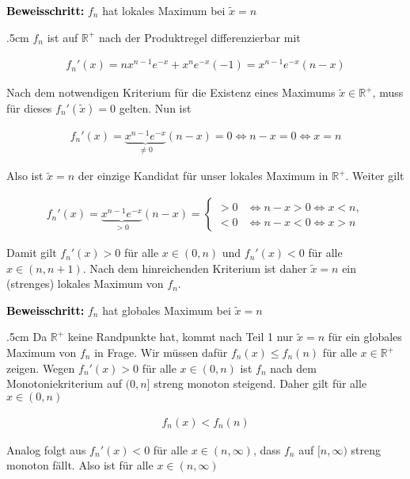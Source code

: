 \documentclass[fontsize=9pt,
               parskip=half-,
               DIV=14,
               listof=chapterentry,
               tocflat]{scrbook}
\newenvironment{indentblock}{\begin{adjustwidth}{.5cm}{}}{\end{adjustwidth}}
\newcommand{\proofstep}[1]{\textbf{\textcolor{Black}{#1}}}
\begin{document}
\begin{solution*}
\proofstep{Beweisschritt:}
 $f_{n}$ hat lokales Maximum bei ${\tilde {x}}=n$\begin{indentblock}
$f_{n}$ ist auf $\mathbb {R} ^{+}$ nach der Produktregel differenzierbar mit

\begin{align*}
f_{n}'(x)=nx^{n-1}e^{-x}+x^{n}e^{-x}(-1)=x^{n-1}e^{-x}(n-x)
\end{align*}

Nach dem notwendigen Kriterium für die Existenz eines Maximums ${\tilde {x}}\in \mathbb {R} ^{+}$, muss für dieses $f_{n}'({\tilde {x}})=0$ gelten. Nun ist

\begin{align*}
f_{n}'(x)=\underbrace {x^{n-1}e^{-x}} _{\neq 0}(n-x)=0\iff n-x=0\iff x=n
\end{align*}

Also ist ${\tilde {x}}=n$ der einzige Kandidat für unser lokales Maximum in $\mathbb {R} ^{+}$. Weiter gilt

\begin{align*}
f_{n}'(x)=\underbrace {x^{n-1}e^{-x}} _{>0}(n-x)={\begin{cases}>0&\iff n-x>0\iff x<n,\\<0&\iff n-x<0\iff x>n\end{cases}}
\end{align*}

Damit gilt $f_{n}'(x)>0$ für alle $x\in (0,n)$ und $f_{n}'(x)<0$ für alle $x\in (n,n+1)$. Nach dem hinreichenden Kriterium ist daher ${\tilde {x}}=n$ ein (strenges) lokales Maximum von $f_{n}$.

\end{indentblock}

\proofstep{Beweisschritt:}
 $f_{n}$ hat globales Maximum bei ${\tilde {x}}=n$\begin{indentblock}
Da $\mathbb {R} ^{+}$ keine Randpunkte hat, kommt nach Teil 1 nur ${\tilde {x}}=n$ für ein globales Maximum von $f_{n}$ in Frage. Wir müssen dafür $f_{n}(x)\leq f_{n}(n)$ für alle $x\in \mathbb {R} ^{+}$ zeigen. Wegen $f_{n}'(x)>0$ für alle $x\in (0,n)$ ist $f_{n}$ nach dem Monotoniekriterium auf $(0,n]$ streng monoton steigend. Daher gilt für alle $x\in (0,n)$

\begin{align*}
f_{n}(x)<f_{n}(n)
\end{align*}

Analog folgt aus $f_{n}'(x)<0$ für alle $x\in (n,\infty )$, dass $f_{n}$ auf $[n,\infty )$ streng monoton fällt. Also ist für alle $x\in (n,\infty )$


\end{indentblock}
\end{solution*}
\end{document}
